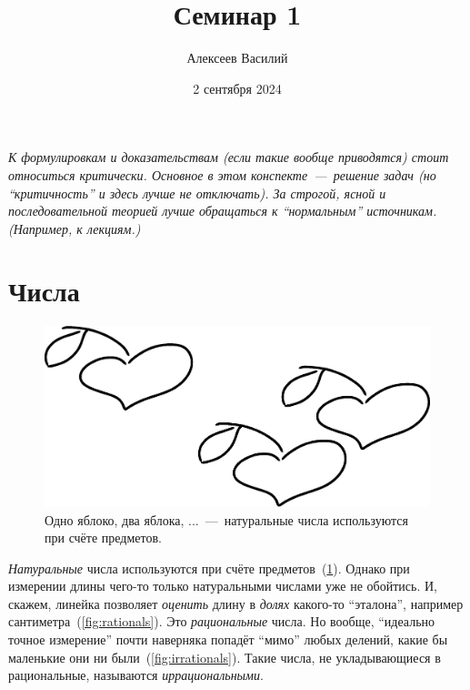\documentclass[a4paper,12pt]{article}
\author{Алексеев Василий}
\title{Семинар 1}
\date{2 сентября 2024}
\begin{document}
  \maketitle
  
  \tableofcontents

  \thispagestyle{empty}
  
  \newpage
  
  
  
  \vspace*{\fill}
  
  \noindent
  \emph{
    К формулировкам и доказательствам (если такие вообще приводятся) стоит относиться критически.
    Основное в этом конспекте~---~решение задач (но ``критичность'' и здесь лучше не отключать).
    За строгой, ясной и последовательной теорией лучше обращаться к ``нормальным'' источникам.
    (Например, к лекциям.)
  }
  
  \vspace*{\fill}
  
  \thispagestyle{empty}
  
  \newpage
  
  


  \section{Числа}
  
  \begin{figure}[ht]
    \centering
    \includegraphics[width=0.6\linewidth]{images/Apples}
    
    \caption{
      Одно яблоко, два яблока, ...~---~натуральные числа используются при счёте предметов.
    }
    \label{fig:naturals}
  \end{figure}
  
  
  \emph{Натуральные} числа используются при счёте предметов~(\ref{fig:naturals}).
  Однако при измерении длины чего-то только натуральными числами уже не обойтись.
  И, скажем, линейка позволяет \emph{оценить} длину в \emph{долях} какого-то ``эталона'', например сантиметра~(\ref{fig:rationals}).
  Это \emph{рациональные} числа.
  Но вообще, ``идеально точное измерение'' почти наверняка попадёт ``мимо'' любых делений, какие бы маленькие они ни были~(\ref{fig:irrationals}).
  Такие числа, не укладывающиеся в рациональные, называются \emph{иррациональными}.
  
\end{document}

